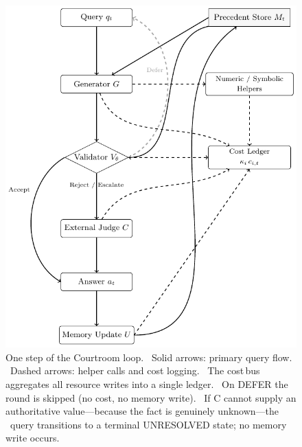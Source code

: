 \documentclass[11pt]{article}
\begin{document}
\begin{figure}[H]
  \centering
  \includegraphics[width=0.9\linewidth]{figs/courtroom}%
  \caption{One step of the Courtroom loop.%
           \ Solid arrows: primary query flow.%
           \ Dashed arrows: helper calls and cost logging.%
           \ The cost\,bus aggregates all resource writes into a single ledger.
           \ On \textsc{DEFER} the round is skipped (no cost, no memory write).
           \ If C cannot supply an authoritative value—because the fact is genuinely unknown—the 
           \ query transitions to a terminal UNRESOLVED state; no memory write occurs.}
  \label{fig:courtroom}
\end{figure}
\end{document}
